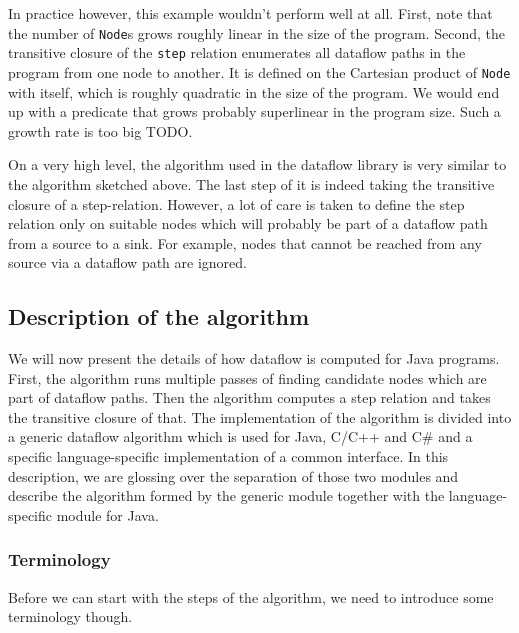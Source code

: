 In practice however, this example wouldn't perform well at all.
First, note that the number of \texttt{Node}s grows roughly linear in the size of
the program.
Second, the transitive closure of the \texttt{step} relation enumerates all dataflow
paths in the program from one node to another.
It is defined on the Cartesian product of \texttt{Node} with itself, which is roughly quadratic 
in the size of the program.
We would end up with a predicate that grows probably superlinear in the program size.
Such a growth rate is too big TODO.

On a very high level, the algorithm used in the dataflow library is very similar 
to the algorithm sketched above.
The last step of it is indeed taking the transitive closure of a step-relation.
However, a lot of care is taken to define the step relation only on suitable 
nodes which will probably be part of a dataflow path from a source to a sink.
For example, nodes that cannot be reached from any source via a dataflow path 
are ignored.

\subsection{Description of the algorithm}
We will now present the details of how dataflow is computed for Java programs.
First, the algorithm runs multiple passes of finding candidate nodes which are part 
of dataflow paths.
Then the algorithm computes a step relation and takes the transitive closure of that.
The implementation of the algorithm is divided into a generic dataflow algorithm which is 
used for Java, C/C++ and C\# and a specific language-specific implementation of a common interface.
In this description, we are glossing over the separation of those two modules and 
describe the algorithm formed by the generic module together with the language-specific
module for Java.

\subsubsection*{Terminology}
Before we can start with the steps of the algorithm, we need to introduce some terminology though.

